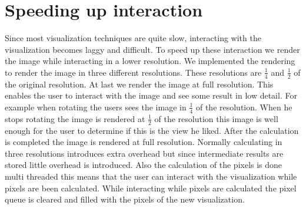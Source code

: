 \documentclass[a4paper,twoside,11pt]{article}
\begin{document}
\section{Speeding up interaction}
Since most visualization techniques are quite slow, interacting with the visualization becomes laggy and difficult. To speed up these interaction we render the image while interacting in a lower resolution. We implemented the rendering to render the image in three different resolutions. These resolutions are $\frac{1}{4}$ and $\frac{1}{2}$ of the original resolution. At last we render the image at full resolution.
This enables the user to interact with the image and see some result in low detail. For example when rotating the users sees the image in $\frac{1}{4}$ of the resolution. When he stops rotating the image is rendered at $\frac{1}{2}$ of the resolution this image is well enough for the user to determine if this is the view he liked. After the calculation is completed the image is rendered at full resolution.
Normally calculating in three resolutions introduces extra overhead but since intermediate results are stored little overhead is introduced.
Also the calculation of the pixels is done multi threaded this means that the user can interact with the visualization while pixels are been calculated. While interacting while pixels are calculated the pixel queue is cleared and filled with the pixels of the new visualization.
\end{document}
